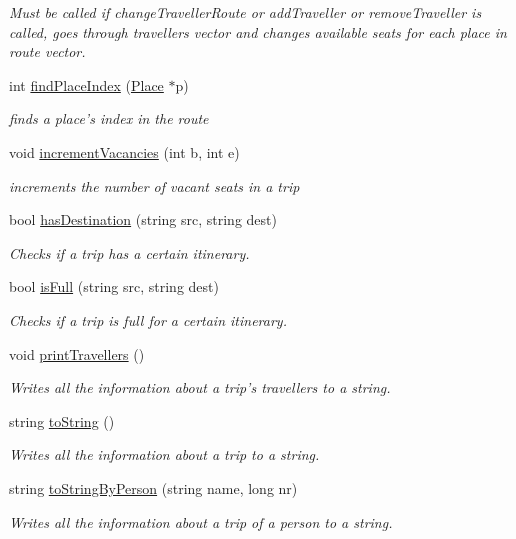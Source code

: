 \begin{DoxyCompactItemize}
\begin{DoxyCompactList}\small\item\em Must be called if change\+Traveller\+Route or add\+Traveller or remove\+Traveller is called, goes through travellers vector and changes available seats for each place in route vector. \end{DoxyCompactList}\item 
int \hyperlink{class_trip_a63a140b56758f30d8e998a11e70dbcfb}{find\+Place\+Index} (\hyperlink{class_place}{Place} $\ast$p)
\begin{DoxyCompactList}\small\item\em finds a place's index in the route \end{DoxyCompactList}\item 
void \hyperlink{class_trip_a724c6dcaf124441f5abdc9704e197ec5}{increment\+Vacancies} (int b, int e)
\begin{DoxyCompactList}\small\item\em increments the number of vacant seats in a trip \end{DoxyCompactList}\item 
bool \hyperlink{class_trip_ad7d5ff318768408eafe7206c41086814}{has\+Destination} (string src, string dest)
\begin{DoxyCompactList}\small\item\em Checks if a trip has a certain itinerary. \end{DoxyCompactList}\item 
bool \hyperlink{class_trip_adc0c1ce8dd300b09c0f01893df0deb04}{is\+Full} (string src, string dest)
\begin{DoxyCompactList}\small\item\em Checks if a trip is full for a certain itinerary. \end{DoxyCompactList}\item 
void \hyperlink{class_trip_a828dfd3992601e083f974e489ae66255}{print\+Travellers} ()
\begin{DoxyCompactList}\small\item\em Writes all the information about a trip's travellers to a string. \end{DoxyCompactList}\item 
string \hyperlink{class_trip_a8394f34452552c84d48c755279a65662}{to\+String} ()
\begin{DoxyCompactList}\small\item\em Writes all the information about a trip to a string. \end{DoxyCompactList}\item 
string \hyperlink{class_trip_a0ea71b8e1cbf3f6f87e668f58c365c41}{to\+String\+By\+Person} (string name, long nr)
\begin{DoxyCompactList}\small\item\em Writes all the information about a trip of a person to a string. \end{DoxyCompactList}\end{DoxyCompactItemize}
